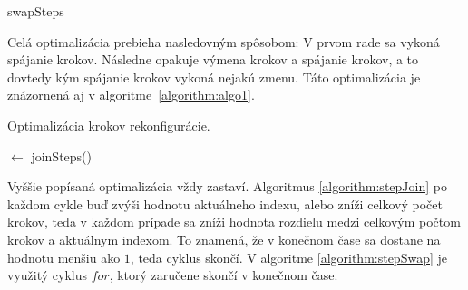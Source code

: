 \documentclass[
  digital, %
  oneside, %
  notable,   %
  lof,     %
  nolot,     %
]{fithesis3}
\begin{document}
\begin{algorithm}
    \caption{swapSteps}
    \label{algorithm:stepSwap}
    
    \DontPrintSemicolon
    
\end{algorithm}

Celá optimalizácia prebieha nasledovným spôsobom: V prvom rade sa vykoná spájanie krokov. Následne opakuje výmena krokov a spájanie krokov, a to dovtedy kým spájanie krokov vykoná nejakú zmenu. Táto optimalizácia je znázornená aj v algoritme~\ref{algorithm:algo1}. 

\begin{algorithm}
    \caption{Optimalizácia krokov rekonfigurácie. }
    \label{algorithm:algo1}
    
    \DontPrintSemicolon
    
    \Steps $\leftarrow$ joinSteps(\Steps)\;
\end{algorithm}

Vyššie popísaná optimalizácia vždy zastaví. Algoritmus \ref{algorithm:stepJoin} po každom cykle buď zvýši hodnotu aktuálneho indexu, alebo zníži celkový počet krokov, teda v každom prípade sa zníži hodnota rozdielu medzi celkovým počtom krokov a aktuálnym indexom. To znamená, že v konečnom čase sa dostane na hodnotu menšiu ako $1$, teda cyklus skončí. V algoritme \ref{algorithm:stepSwap} je využitý cyklus $for$, ktorý zaručene skončí v konečnom čase. 
\end{document}
